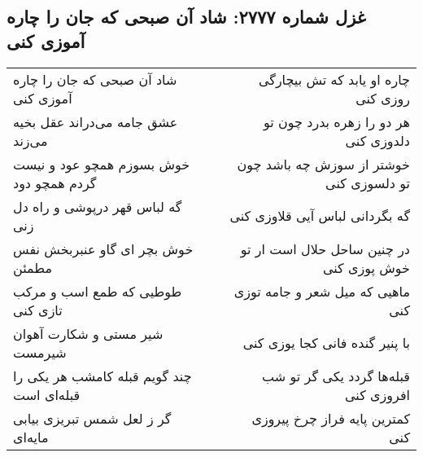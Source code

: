 \begin{center}
\section*{غزل شماره ۲۷۷۷: شاد آن صبحی که جان را چاره آموزی کنی}
\label{sec:2777}
\begin{longtable}{l p{0.5cm} r}
شاد آن صبحی که جان را چاره آموزی کنی
&&
چاره او یابد که تش بیچارگی روزی کنی
\\
عشق جامه می‌دراند عقل بخیه می‌زند
&&
هر دو را زهره بدرد چون تو دلدوزی کنی
\\
خوش بسوزم همچو عود و نیست گردم همچو دود
&&
خوشتر از سوزش چه باشد چون تو دلسوزی کنی
\\
گه لباس قهر درپوشی و راه دل زنی
&&
گه بگردانی لباس آیی قلاوزی کنی
\\
خوش بچر ای گاو عنبربخش نفس مطمئن
&&
در چنین ساحل حلال است ار تو خوش پوزی کنی
\\
طوطیی که طمع اسب و مرکب تازی کنی
&&
ماهیی که میل شعر و جامه توزی کنی
\\
شیر مستی و شکارت آهوان شیرمست
&&
با پنیر گنده فانی کجا یوزی کنی
\\
چند گویم قبله کامشب هر یکی را قبله‌ای است
&&
قبله‌ها گردد یکی گر تو شب افروزی کنی
\\
گر ز لعل شمس تبریزی بیابی مایه‌ای
&&
کمترین پایه فراز چرخ پیروزی کنی
\\
\end{longtable}
\end{center}
